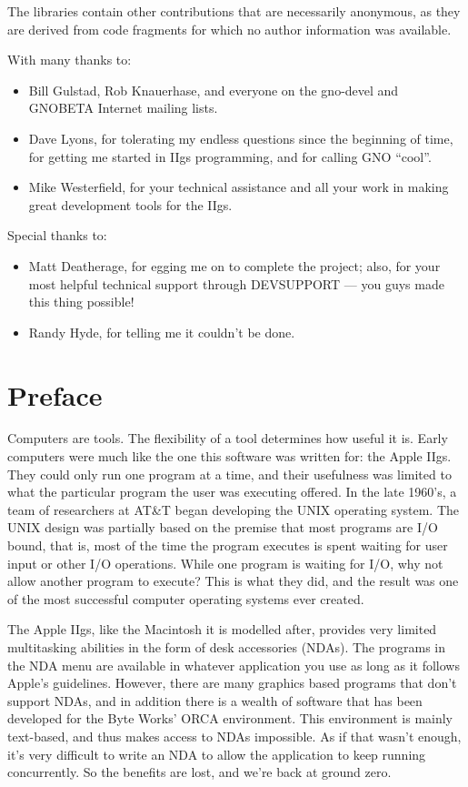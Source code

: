 \documentclass{report}
\begin{document}
The libraries contain other contributions that are necessarily anonymous,
as they are derived from code fragments for which no author information
was available.

With many thanks to:
\begin{itemize}
\item
Bill Gulstad, Rob Knauerhase,
and everyone on the gno-devel and GNOBETA Internet mailing lists.
\item 
Dave Lyons, for tolerating my endless
questions since the beginning of time, for getting me
started in IIgs programming, and for calling GNO ``cool''.
\item
Mike Westerfield, for your
technical assistance and all your work in making great
development tools for the IIgs.
\end{itemize}

Special thanks to:
\begin{itemize}
\item
Matt Deatherage, for egging me on to
complete the project; also, for your most helpful
technical support through DEVSUPPORT --- you guys made this thing possible!
\item
Randy Hyde, for telling me it couldn't be done.
\end{itemize}

\chapter{Preface}

Computers are tools. The flexibility of a
tool determines how useful it is. Early computers were much like
the one this software was written for: the Apple IIgs. They could
only run one program at a time, and their usefulness was limited
to what the particular program the user was executing offered. In
the late 1960's, a team of researchers at AT\&T began
developing the UNIX operating system. The UNIX design was
partially based on the premise that most programs are I/O bound,
that is, most of the time the program executes is spent waiting
for user input or other I/O operations. While one program is
waiting for I/O, why not allow another program to execute? This
is what they did, and the result was one of the most successful
computer operating systems ever created.

The Apple IIgs, like the Macintosh it is
modelled after, provides very limited multitasking abilities in
the form of desk accessories (NDAs). The programs in the NDA menu
are available in whatever application you use as long as it
follows Apple's guidelines. However, there are many graphics
based programs that don't support NDAs, and in addition there is
a wealth of software that has been developed for the Byte Works'
ORCA environment. This environment is mainly text-based, and thus
makes access to NDAs impossible. As if that wasn't enough, it's
very difficult to write an NDA to allow the application to keep
running concurrently. So the benefits are lost, and we're back at
ground zero.
\end{document}
